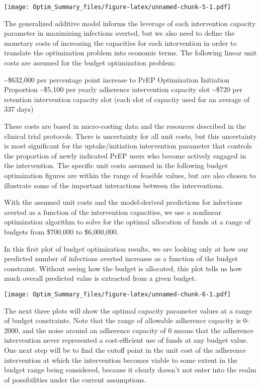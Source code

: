 \documentclass[
]{article}
\begin{document}
\texttt{[image: Optim\_Summary\_files/figure-latex/unnamed-chunk-5-1.pdf]}

The generalized additive model informs the leverage of each intervention
capacity parameter in maximizing infections averted, but we also need to
define the monetary costs of increasing the capacities for each
intervention in order to translate the optimization problem into
economic terms. The following linear unit costs are assumed for the
budget optimization problem:

\textasciitilde\$632,000 per percentage point increase to PrEP
Optimization Initiation Proportion \textasciitilde\$5,100 per yearly
adherence intervention capacity slot \textasciitilde\$720 per retention
intervention capacity slot (each slot of capacity used for an average of
337 days)

These costs are based in micro-costing data and the resources described
in the clinical trial protocols. There is uncertainty for all unit
costs, but this uncertainty is most significant for the
uptake/initiation intervention parameter that controls the proportion of
newly indicated PrEP users who become actively engaged in the
intervention. The specific unit costs assumed in the following budget
optimization figures are within the range of feasible values, but are
also chosen to illustrate some of the important interactions between the
interventions.

With the assumed unit costs and the model-derived predictions for
infections averted as a function of the intervention capacities, we use
a nonlinear optimization algorithm to solve for the optimal allocation
of funds at a range of budgets from \$700,000 to \$6,000,000.

In this first plot of budget optimization results, we are looking only
at how our predicted number of infections averted increases as a
function of the budget constraint. Without seeing how the budget is
allocated, this plot tells us how much overall predicted value is
extracted from a given budget.

\texttt{[image: Optim\_Summary\_files/figure-latex/unnamed-chunk-6-1.pdf]}

The next three plots will show the optimal capacity parameter values at
a range of budget constraints. Note that the range of allowable
adherence capacity is 0-2000, and the noise around an adherence capacity
of 0 means that the adherence intervention never represented a
cost-efficient use of funds at any budget value. One next step will be
to find the cutoff point in the unit cost of the adherence intervention
at which the intervention becomes viable to some extent in the budget
range being considered, because it clearly doesn't not enter into the
realm of possibilities under the current assumptions.
\end{document}
